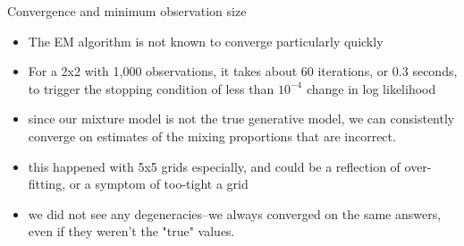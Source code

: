 \documentclass{beamer}
\begin{document}
\begin{frame}[shrink]{Convergence and minimum observation size}
		
	
	\begin{itemize}
		\item The EM algorithm is not known to converge particularly quickly
		\item For a 2x2 with 1,000 observations, it takes about 60 iterations, or 0.3 seconds, to trigger the stopping condition of less than $10^{-4}$ change in log likelihood
		
		\item since our mixture model is not the true generative model, we can consistently converge on estimates of the mixing proportions that are incorrect.
		\item this happened with 5x5 grids especially, and could be a reflection of over-fitting, or a symptom of too-tight a grid
		\item we did not see any degeneracies--we always converged on the same answers, even if they weren't the "true" values.
		
	\end{itemize}
	
\end{frame}
\end{document}

